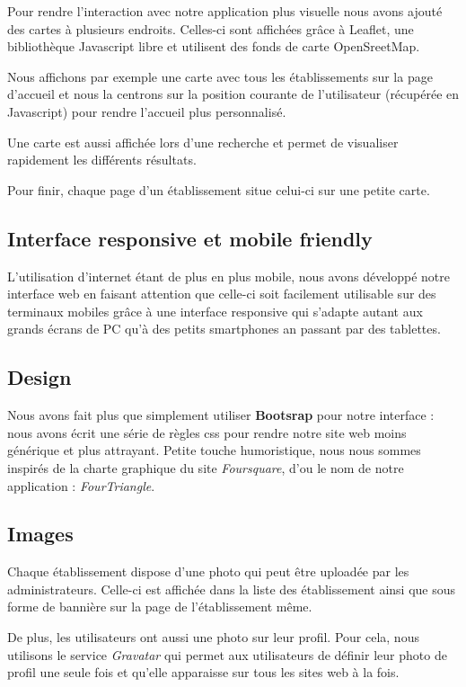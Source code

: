 \documentclass[10pt,a4paper]{article}
\begin{document}
Pour rendre l’interaction avec notre application plus visuelle nous avons ajouté des cartes à plusieurs endroits. Celles-ci sont affichées grâce à Leaflet, une bibliothèque Javascript libre et utilisent des fonds de carte OpenSreetMap.

Nous affichons par exemple une carte avec tous les établissements sur la page d'accueil et nous la centrons sur la position courante de l'utilisateur (récupérée en Javascript) pour rendre l'accueil plus personnalisé.

Une carte est aussi affichée lors d'une recherche et permet de visualiser rapidement les différents résultats.

Pour finir, chaque page d'un établissement situe celui-ci sur une petite carte.

\subsection{Interface responsive et mobile friendly}

L'utilisation d'internet étant de plus en plus mobile, nous avons développé notre interface web en faisant attention que celle-ci soit facilement utilisable sur des terminaux mobiles grâce à une interface responsive qui s'adapte autant aux grands écrans de PC qu'à des petits smartphones an passant par des tablettes.

\subsection{Design}

Nous avons fait plus que simplement utiliser \textbf{Bootsrap} pour notre interface : nous avons écrit une série de règles css pour rendre notre site web moins générique et plus attrayant. Petite touche humoristique, nous nous sommes inspirés de la charte graphique du site \textit{Foursquare}, d'ou le nom de notre application : \textit{FourTriangle}.

\subsection{Images}

Chaque établissement dispose d'une photo qui peut être uploadée par les administrateurs. Celle-ci est affichée dans la liste des établissement ainsi que sous forme de bannière sur la page de l'établissement même.

De plus, les utilisateurs ont aussi une photo sur leur profil. Pour cela, nous utilisons le service \textit{Gravatar} qui permet aux utilisateurs de définir leur photo de profil une seule fois et qu'elle apparaisse sur tous les sites web à la fois.
\end{document}
